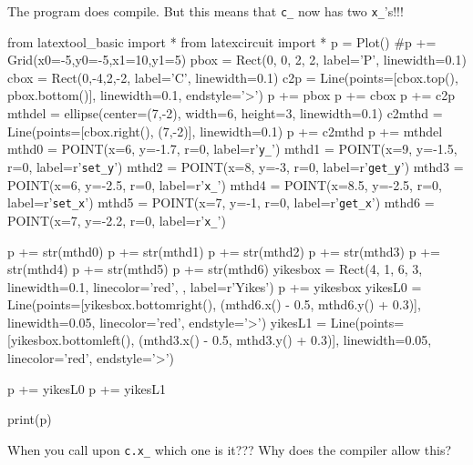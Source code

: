 The program does compile. But this means that \verb!c_! now has two
\verb!x_!'s!!!
\begin{python}
from latextool_basic import *
from latexcircuit import *
p = Plot()
#p += Grid(x0=-5,y0=-5,x1=10,y1=5)
pbox = Rect(0, 0, 2, 2, label='P', linewidth=0.1)
cbox = Rect(0,-4,2,-2, label='C', linewidth=0.1)
c2p = Line(points=[cbox.top(), pbox.bottom()], linewidth=0.1, endstyle='>')
p += pbox
p += cbox
p += c2p
mthdel = ellipse(center=(7,-2), width=6, height=3, linewidth=0.1)
c2mthd = Line(points=[cbox.right(), (7,-2)], linewidth=0.1)
p += c2mthd
p += mthdel
mthd0 = POINT(x=6, y=-1.7, r=0, label=r'\verb!y_!')
mthd1 = POINT(x=9, y=-1.5, r=0, label=r'\verb!set_y!')
mthd2 = POINT(x=8, y=-3, r=0, label=r'\verb!get_y!')
mthd3 = POINT(x=6, y=-2.5, r=0, label=r'\verb!x_!')
mthd4 = POINT(x=8.5, y=-2.5, r=0, label=r'\verb!set_x!')
mthd5 = POINT(x=7, y=-1, r=0, label=r'\verb!get_x!')
mthd6 = POINT(x=7, y=-2.2, r=0, label=r'\verb!x_!')

p += str(mthd0)
p += str(mthd1)
p += str(mthd2)
p += str(mthd3)
p += str(mthd4)
p += str(mthd5)
p += str(mthd6)
yikesbox = Rect(4, 1, 6, 3, linewidth=0.1, linecolor='red', , label=r'Yikes')
p += yikesbox
yikesL0 = Line(points=[yikesbox.bottomright(), (mthd6.x() - 0.5, mthd6.y() + 0.3)], linewidth=0.05, linecolor='red', endstyle='>')
yikesL1 = Line(points=[yikesbox.bottomleft(), (mthd3.x() - 0.5, mthd3.y() + 0.3)], linewidth=0.05, linecolor='red', endstyle='>')

p += yikesL0
p += yikesL1

print(p)
\end{python}
When you call upon \verb!c.x_! which one is it??? Why does the compiler
allow this?

